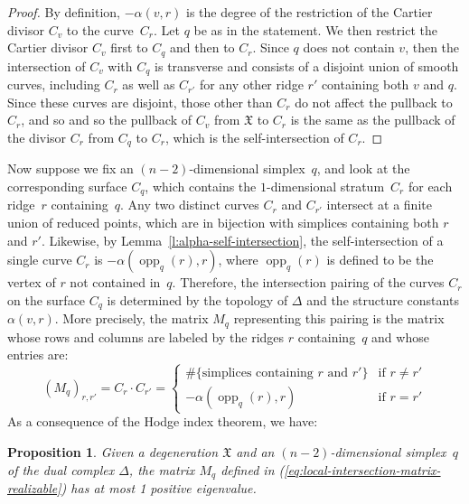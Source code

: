 \documentclass[11pt,reqno]{amsart}
\newtheorem{prop}[thm]{Proposition}
\theoremstyle{definition}
\newcommand{\opp}{\operatorname{opp}}
\newcommand{\X}{\mathfrak X}
\begin{document}
\begin{proof}
By definition, $-\alpha(v,r)$ is the degree of the restriction of the Cartier
divisor $C_v$ to the curve~$C_r$. Let $q$ be as in the statement. We then
restrict the Cartier divisor $C_v$ first to $C_q$ and then to $C_r$. Since $q$
does not contain $v$, then the intersection of $C_v$ with $C_q$ is transverse
and consists of a disjoint union of smooth curves, including $C_r$ as well as
$C_{r'}$ for any other ridge $r'$ containing both $v$ and $q$. Since these
curves are disjoint, those other than $C_r$ do not affect the pullback to $C_r$,
and so and so the pullback of $C_v$ from $\X$ to $C_r$ is the same as the
pullback of the divisor $C_r$ from $C_q$ to $C_r$, which is the
self-intersection of $C_r$.
\end{proof}

Now suppose we fix an $(n-2)$-dimensional simplex~$q$, and look at the
corresponding surface $C_q$, which contains the $1$-dimensional stratum~$C_r$
for each ridge~$r$ containing~$q$. Any two distinct curves $C_r$ and $C_{r'}$
intersect at a finite union of reduced points, which are in bijection with
simplices containing both $r$ and $r'$. Likewise, by
Lemma~\ref{l:alpha-self-intersection}, the self-intersection of a single curve
$C_r$ is $-\alpha(\opp_q(r), r)$, where $\opp_q(r)$ is defined to be the vertex
of $r$ not contained in~$q$. Therefore, the intersection pairing of
the curves $C_r$ on the surface $C_q$ is determined by the topology
of $\Delta$ and the structure constants $\alpha(v,r)$. More precisely, the
matrix $M_q$
representing this pairing is the matrix
whose rows and columns are labeled by the ridges $r$ containing~$q$ and whose
entries are:
\begin{equation}\label{eq:local-intersection-matrix-realizable}
(M_q)_{r, r'} = C_r \cdot C_{r'} =
\begin{cases}
\# \{\mbox{simplices containing $r$ and $r'$}\} & \mbox{if } r \neq r' \\
-\alpha(\opp_q(r), r) & \mbox{if } r = r'
\end{cases}
\end{equation}
As a consequence of the Hodge index theorem, we have:

\begin{prop}\label{p:at-most-one-positive}
Given a degeneration $\X$ and an $(n-2)$-dimensional simplex~$q$ of the dual
complex $\Delta$, the matrix $M_q$ defined in
(\ref{eq:local-intersection-matrix-realizable}) has at most 1 positive
eigenvalue.
\end{prop}
\end{document}
